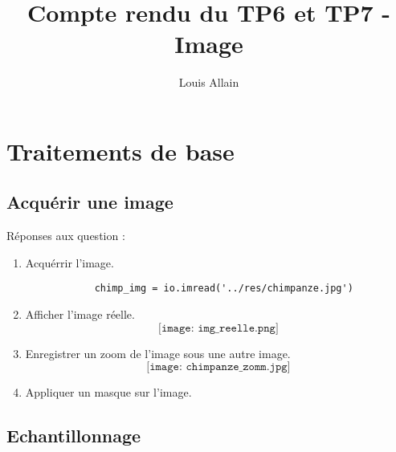 \documentclass[12pt]{article}
\begin{document}
\title{Compte rendu du TP6 et TP7 - Image}
\author{Louis Allain}
\maketitle

\section{Traitements de base}

\subsection{Acquérir une image}

Réponses aux question :
\begin{enumerate}

	\item 
		Acquérrir l'image.
		\begin{verbatim}
			chimp_img = io.imread('../res/chimpanze.jpg')
		\end{verbatim}
		
	\item
		Afficher l'image réelle.
		$$
			\texttt{[image: img\_reelle.png]}
		$$
		
	\item
		Enregistrer un zoom de l'image sous une autre image.
		$$
			\texttt{[image: chimpanze\_zomm.jpg]}
		$$
		
	\item
		Appliquer un masque sur l'image.
		
\end{enumerate}

\subsection{Echantillonnage}
	
\end{document}
